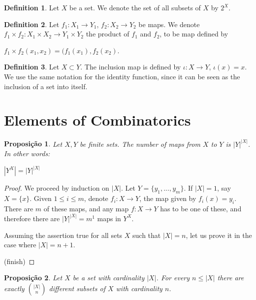 \documentclass[]{article}
\newtheorem{proposition}{Proposição}[section]
\theoremstyle{definition}
\newtheorem{definition}{Definition}[section]
\theoremstyle{definition}
\newcommand{\raw}{\rightarrow}
\begin{document}
\begin{definition}
	Let $X$ be a set. We denote the set of all subsets of $X$ by $2^X$.
\end{definition}

\begin{definition}
	Let $f_1:X_1 \raw Y_1$, $f_2:X_2 \raw Y_2$ be maps. We denote $f_1 \times f_2: X_1 \times X_2 \raw Y_1 \times Y_2$ the product of $f_1$ and $f_2$, to be map defined by 
	
	\begin{center}
	$f_1 \times f_2(x_1, x_2) = (f_1(x_1), f_2(x_2)$.
	\end{center}
\end{definition}

\begin{definition}
	Let $X \subset Y$. The inclusion map is defined by $\iota: X \raw Y$, $\iota(x)=x$. We use the same notation for the identity function, since it can be seen as the inclusion of a set into itself.
\end{definition}


\section{Elements of Combinatorics}

\begin{proposition}
	
	Let $X, Y$ be finite sets. The number of maps from $X$ to $Y$ is $|Y|^{|X|}$. In other words:
	
	\begin{center}
		$|Y^X| = |Y|^{|X|}$
	\end{center}
	
\end{proposition}

\begin{proof}
	We proceed by induction on $|X|$. Let $Y=\{y_1, ..., y_m \}$. If $|X| = 1$, say $X = \{x\}$. Given $1 \leq i \leq m$, denote $f_i:X \raw Y$, the map given by $f_i(x)=y_i$. There are $m$ of these maps, and any map $f:X \raw Y$ has to be one of these, and therefore there are $|Y|^{|X|} = m^1$ maps in $Y^X$.
	
	Assuming the assertion true for all sets $X$ such that $|X|=n$, let us prove it in the case where $|X|= n+1$.	
	
	(finish)
\end{proof}

\begin{proposition}
	Let $X$ be a set with cardinality $|X|$. For every $n\leq|X|$ there are exactly $\binom{|X|}{n}$ different subsets of $X$ with cardinality $n$.
\end{proposition}
\end{document}
